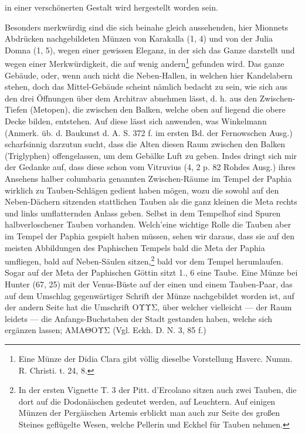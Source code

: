 \documentclass[a4paper, 11pt, oneside, polutonikogreek, german]{article}
\begin{document}
in einer verschönerten Gestalt wird hergestellt worden sein.

Besonders merkwürdig sind die sich beinahe gleich aussehenden, hier Mionnets Abdrücken nachgebildeten Münzen von Karakalla (1, 4) und von der Julia Domna (1, 5), wegen einer gewissen Eleganz, in der sich das Ganze darstellt und wegen einer Merkwürdigkeit, die auf wenig andern\footnote{Eine Münze der Didia Clara gibt völlig dieselbe Vorstellung Haverc. Numm. R. Christi. t. 24, 8.} gefunden wird. Das ganze Gebäude, oder, wenn auch nicht die Neben-Hallen, in welchen hier Kandelabern stehen, doch das Mittel-Gebäude scheint nämlich bedacht zu sein, wie sich aus den drei Öffnungen über dem Architrav abnehmen lässt, d. h. aus den Zwischen-Tiefen (Metopen), die zwischen den Balken, welche oben auf liegend die obere Decke bilden, entstehen. Auf diese lässt sich anwenden, was Winkelmann (Anmerk. üb. d. Baukunst d. A. S. 372 f. im ersten Bd. der Fernowschen Ausg.) scharfsinnig darzutun sucht, dass die Alten diesen Raum zwischen den Balken (Triglyphen) offengelassen, um dem Gebälke Luft zu geben. Indes dringt sich mir der Gedanke auf, dass diese schon vom Vitruvius (4, 2 p. 82 Rohdes Ausg.) ihres Ansehens halber columbaria genannten Zwischen-Räume im Tempel der Paphia wirklich zu Tauben-Schlägen gedient haben mögen, wozu die sowohl auf den Neben-Dächern sitzenden stattlichen Tauben als die ganz kleinen die Meta rechts und links umflatternden Anlass geben. Selbst in dem Tempelhof sind Spuren halbverloschener Tauben vorhanden. Welch'eine wichtige Rolle die Tauben aber im Tempel der Paphia gespielt haben müssen, sehen wir daraus, dass sie auf den meisten Abbildungen des Paphischen Tempels bald die Meta der Paphia umfliegen, bald auf Neben-Säulen sitzen,\footnote{In der ersten Vignette T. 3 der Pitt. d'Ercolano sitzen auch zwei Tauben, die dort auf die Dodonäischen gedeutet werden, auf Leuchtern. Auf einigen Münzen der Pergäischen Artemis erblickt man auch zur Seite des großen Steines geflügelte Wesen, welche Pellerin und Eckhel für Tauben nehmen.} bald vor dem Tempel herumlaufen. Sogar auf der Meta der Paphischen Göttin sitzt 1., 6 eine Taube. Eine Münze bei Hunter (67, 25) mit der Venus-Büste auf der einen und einem Tauben-Paar, das auf dem Umschlag gegenwärtiger Schrift der Münze nachgebildet worden ist, auf der andern Seite hat die Umschrift ΟΥΥΣ, über welcher vielleicht --- der Raum leidets --- die Anfangs-Buchstaben der Stadt gestanden haben, welche sich ergänzen lassen; ΑΜΑΘΟΥΣ (Vgl. Eckh. D. N. 3, 85 f.)
\end{document}
